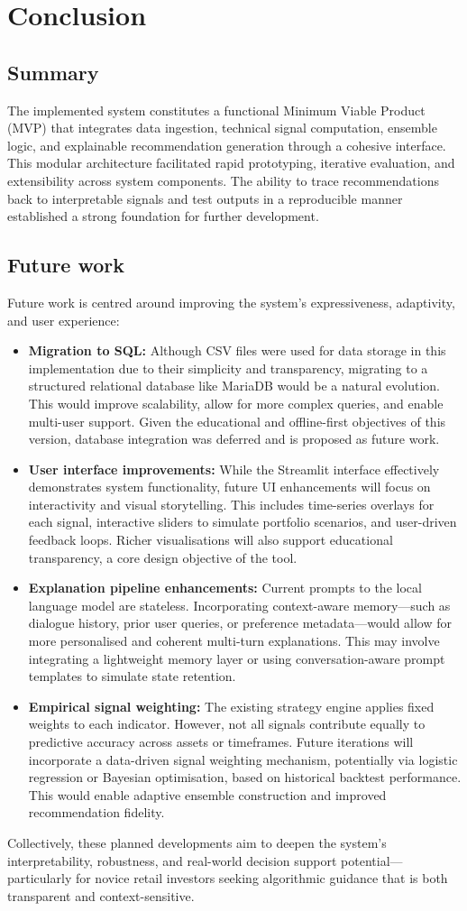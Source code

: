 \section{Conclusion}

\subsection{Summary}
The implemented system constitutes a functional Minimum Viable Product (MVP) that integrates data ingestion, technical signal computation, ensemble logic, and explainable recommendation generation through a cohesive interface. This modular architecture facilitated rapid prototyping, iterative evaluation, and extensibility across system components. The ability to trace recommendations back to interpretable signals and test outputs in a reproducible manner established a strong foundation for further development.

\subsection{Future work}
Future work is centred around improving the system’s expressiveness, adaptivity, and user experience:

\begin{itemize}
\item \textbf{Migration to SQL:} Although CSV files were used for data storage in this implementation due to their simplicity and transparency, migrating to a structured relational database like MariaDB would be a natural evolution. This would improve scalability, allow for more complex queries, and enable multi-user support. Given the educational and offline-first objectives of this version, database integration was deferred and is proposed as future work.
\item \textbf{User interface improvements:} While the Streamlit interface effectively demonstrates system functionality, future UI enhancements will focus on interactivity and visual storytelling. This includes time-series overlays for each signal, interactive sliders to simulate portfolio scenarios, and user-driven feedback loops. Richer visualisations will also support educational transparency, a core design objective of the tool.
\item \textbf{Explanation pipeline enhancements:} Current prompts to the local language model are stateless. Incorporating context-aware memory—such as dialogue history, prior user queries, or preference metadata—would allow for more personalised and coherent multi-turn explanations. This may involve integrating a lightweight memory layer or using conversation-aware prompt templates to simulate state retention.
\item \textbf{Empirical signal weighting:} The existing strategy engine applies fixed weights to each indicator. However, not all signals contribute equally to predictive accuracy across assets or timeframes. Future iterations will incorporate a data-driven signal weighting mechanism, potentially via logistic regression or Bayesian optimisation, based on historical backtest performance. This would enable adaptive ensemble construction and improved recommendation fidelity.
\end{itemize}

Collectively, these planned developments aim to deepen the system’s interpretability, robustness, and real-world decision support potential—particularly for novice retail investors seeking algorithmic guidance that is both transparent and context-sensitive.